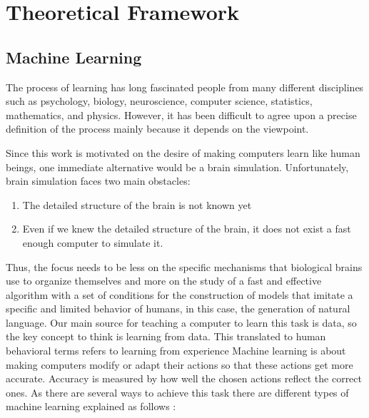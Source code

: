 \chapter{Theoretical Framework}
\label{ch:teo2}



\section{Machine Learning}

The process of learning has long fascinated people from many different disciplines such as psychology, biology, neuroscience, computer science, statistics, mathematics, and physics. However, it has been difficult to agree upon a precise definition of the process mainly because it depends on the viewpoint.


Since this work is motivated on the desire of making computers learn like human beings, one immediate alternative would be a brain simulation. Unfortunately, brain simulation faces two main obstacles\cite{natarajan2014machine}:
\begin{enumerate}
\item  The detailed structure of the brain is not known yet
\item Even if we knew the detailed structure of the brain, it does not exist a fast enough computer to simulate it. 
\end{enumerate}

Thus, the focus needs to be less on the specific mechanisms that biological brains use to organize themselves and more on the study of a fast and effective algorithm with a set of conditions for the construction of models that imitate a specific and limited behavior of humans\cite{strom2007hebbian}, in this case, the generation of natural language. Our main source for teaching a computer to learn this task is data, so the key concept to think is learning from data. This translated to human behavioral terms refers to learning from experience
Machine learning is about making computers modify or adapt their actions so that these actions get more accurate. Accuracy is measured by how well the chosen actions reflect the correct ones. As there are several ways to achieve this task there are different types of machine learning explained as follows \cite{marsland2015machine}:

